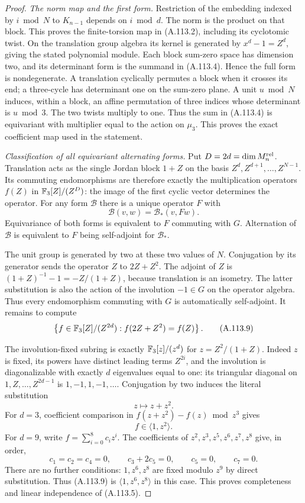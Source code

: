 \begin{proof}
\emph{The norm map and the first form.}
Restriction of the embedding indexed by $i\bmod N$ to $K_{n-1}$
depends on $i\bmod d$.  The norm is the product on that block.
This proves the finite-torsion map in (A.113.2), including its
cyclotomic twist.  On the translation group algebra its kernel
is generated by $x^d-1=Z^d$, giving the stated polynomial module.
Each block sum-zero space has dimension two, and its determinant
form is the summand in (A.113.4).  Hence the full form is
nondegenerate.
A translation cyclically permutes a block when it crosses its
end; a three-cycle has determinant one on the sum-zero plane.
A unit $u\bmod N$ induces, within a block, an affine permutation
of three indices whose determinant is $u\bmod3$.
The two twists multiply to one.  Thus the sum in (A.113.4)
is equivariant with multiplier equal to the action on $\mu_3$.
This proves the exact coefficient map used in the statement.

\emph{Classification of all equivariant alternating forms.}
Put $D=2d=\dim M_n^{\rm rel}$.
Translation acts as the single Jordan block $1+Z$ on the basis
$Z^d,Z^{d+1},\ldots,Z^{N-1}$.
Its commuting endomorphisms are therefore exactly
the multiplication operators $f(Z)$ in $\mathbb F_3[Z]/(Z^D)$:
the image of the first cyclic vector determines the operator.
For any form $\mathcal B$ there is a unique operator $F$ with
\[
                \mathcal B(v,w)=\mathcal B_*(v,Fw).
 \tag{A.113.8}
\]
Equivariance of both forms is equivalent to $F$ commuting with
$G$.  Alternation of $\mathcal B$ is equivalent to $F$ being
self-adjoint for $\mathcal B_*$.

The unit group is generated by two at these two values of $N$.
Conjugation by its generator sends the operator $Z$ to
$2Z+Z^2$.
The adjoint of $Z$ is
$(1+Z)^{-1}-1=-Z/(1+Z)$, because translation is an isometry.
The latter substitution is also the action of the involution
$-1\in G$ on the operator algebra.
Thus every endomorphism commuting with $G$ is automatically
self-adjoint.
It remains to compute
\[
 \left\{f\in\mathbb F_3[Z]/(Z^{2d}):
                         f(2Z+Z^2)=f(Z)\right\}.
 \tag{A.113.9}
\]

The involution-fixed subring is exactly
$\mathbb F_3[z]/(z^d)$ for $z=Z^2/(1+Z)$.
Indeed $z$ is fixed, its powers have distinct leading terms
$Z^{2i}$, and the involution is diagonalizable with exactly
$d$ eigenvalues equal to one: its triangular diagonal on
$1,Z,\ldots,Z^{2d-1}$ is $1,-1,1,-1,\ldots$.
Conjugation by two induces the literal substitution
\[
                          z\longmapsto z+z^2.
 \tag{A.113.10}
\]
For $d=3$, coefficient comparison in
$f(z+z^2)-f(z)\bmod z^3$ gives
\[
                 f\in\langle1,z^2\rangle.
 \tag{A.113.11}
\]
For $d=9$, write $f=\sum_{i=0}^8c_i z^i$.
The coefficients of $z^2,z^3,z^5,z^6,z^7,z^8$ give, in order,
\[
 c_1=c_2=c_4=0,\qquad
 c_3+2c_5=0,\qquad c_5=0,\qquad c_7=0.
 \tag{A.113.12}
\]
There are no further conditions: $1,z^6,z^8$ are fixed
modulo $z^9$ by direct substitution.
Thus (A.113.9) is $\langle1,z^6,z^8\rangle$ in this case.
This proves completeness and linear independence of (A.113.5).


\end{proof}
